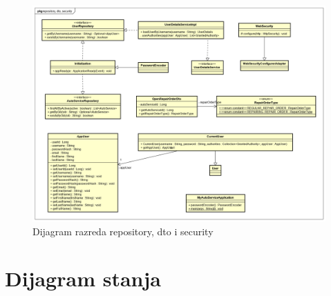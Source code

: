 		\begin{figure}[H]
			\centering
			\includegraphics[width=1.0\linewidth]{dijagrami/class_diagram_other}
			\caption{Dijagram razreda repository, dto i security}
			\label{fig:classdiagramother}
		\end{figure}
		
			
			
			\eject
		
		\section{Dijagram stanja}
			
%			
%			
%			
			
